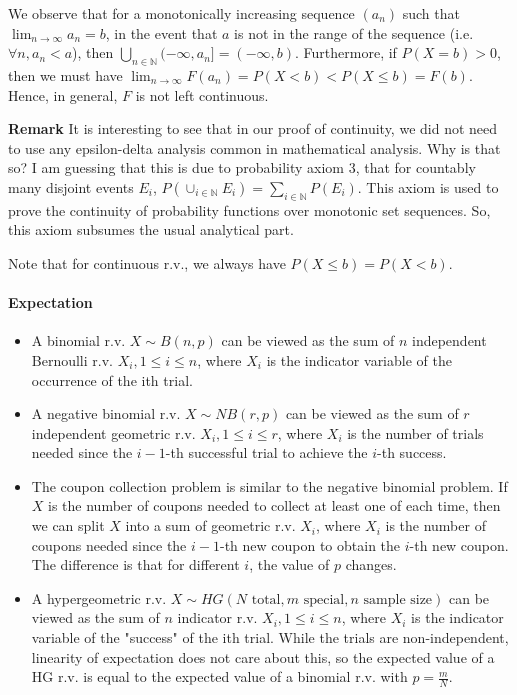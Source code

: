 \documentclass{article}
\begin{document}
We observe that for a monotonically increasing sequence $(a_n)$ such that $\lim_{n\rightarrow \infty}a_n = b$, in the event that $a$ is not in the range of the sequence (i.e. $\forall n, a_n < a$), then $\bigcup_{n\in \mathbb{N}}(-\infty, a_n] = (-\infty, b)$. Furthermore, if $P(X=b) > 0$, then we must have $\lim_{n\rightarrow \infty}F(a_n) = P(X < b) < P(X\leq b) = F(b)$. Hence, in general, $F$ is not left continuous.

\textbf{Remark} It is interesting to see that in our proof of continuity, we did not need to use any epsilon-delta analysis common in mathematical analysis. Why is that so? I am guessing that this is due to probability axiom 3, that for countably many disjoint events $E_i$, $P(\cup_{i\in \mathbb{N}} E_i) = \sum_{i\in \mathbb{N}}P(E_i)$. This axiom is used to prove the continuity of probability functions over monotonic set sequences. So, this axiom subsumes the usual analytical part.

Note that for continuous r.v., we always have $P(X\leq b) = P(X < b)$.

\paragraph{Expectation}
\begin{itemize}
	\item A binomial r.v. $X\sim B(n, p)$ can be viewed as the sum of $n$ independent Bernoulli r.v. $X_i, 1\leq i\leq n$, where $X_i$ is the indicator variable of the occurrence of the ith trial.
	\item A negative binomial r.v. $X\sim NB(r, p)$ can be viewed as the sum of $r$ independent geometric r.v. $X_i, 1\leq i\leq r$, where $X_i$ is the number of trials needed since the $i-1$-th successful trial to achieve the $i$-th success.
	\item  The coupon collection problem is similar to the negative binomial problem. If $X$ is the number of coupons needed to collect at least one of each time, then we can split $X$ into a sum of geometric r.v. $X_i$, where $X_i$ is the number of coupons needed since the $i-1$-th new coupon to obtain the $i$-th new coupon. The difference is that for different $i$, the value of $p$ changes.
	\item A hypergeometric r.v. $X\sim HG(N \text{ total}, m \text{ special}, n \text{ sample size})$ can be viewed as the sum of $n$ indicator r.v. $X_i, 1\leq i\leq n$, where $X_i$ is the indicator variable of the "success" of the ith trial. While the trials are non-independent, linearity of expectation does not care about this, so the expected value of a HG r.v. is equal to the expected value of a binomial r.v. with $p=\frac{m}{N}$.
\end{itemize}
\end{document}
